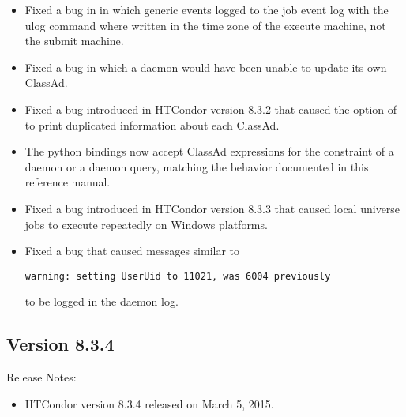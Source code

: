\begin{itemize}

\item Fixed a bug in  in which generic events logged
to the job event log with the ulog command where written in the time zone
of the execute machine, not the submit machine.

\item Fixed a bug in which a  daemon would have been unable 
to update its own ClassAd.

\item Fixed a bug introduced in HTCondor version 8.3.2 that caused the 
 option of  to print duplicated information 
about each ClassAd.

\item The python bindings now accept ClassAd expressions for the constraint
of a  daemon or a  daemon query, 
matching the behavior documented in this reference manual.

\item Fixed a bug introduced in HTCondor version 8.3.3 that caused 
local universe jobs to execute repeatedly on Windows platforms.

\item Fixed a bug that caused messages similar to
\begin{verbatim}
warning: setting UserUid to 11021, was 6004 previously
\end{verbatim}
to be logged in the  daemon log. 

\end{itemize}

\subsection*{\label{sec:New-8-3-4}Version 8.3.4}

\noindent Release Notes:

\begin{itemize}

\item HTCondor version 8.3.4 released on March 5, 2015.

\end{itemize}



